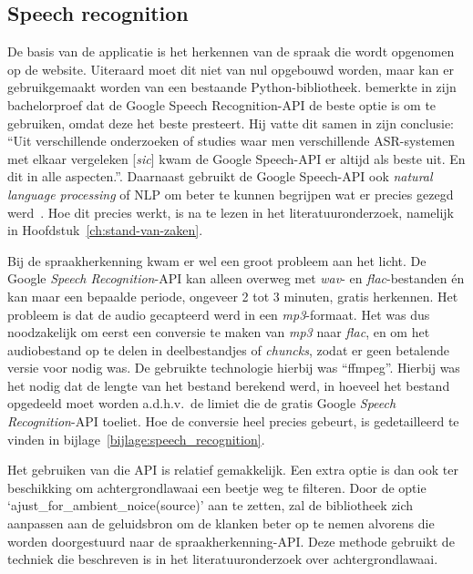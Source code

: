\subsection{Speech recognition}
De basis van de applicatie is het herkennen van de spraak die wordt opgenomen op de website. Uiteraard moet dit niet van nul opgebouwd worden, maar kan er gebruikgemaakt worden van een bestaande Python-bibliotheek. \textcite{Standaert2021} bemerkte in zijn bachelorproef dat  de Google Speech Recognition-API de beste optie is om te gebruiken, omdat deze het beste presteert. Hij vatte dit samen in zijn conclusie: ``Uit verschillende onderzoeken of studies waar men verschillende ASR-systemen met elkaar vergeleken [\textit{sic}] kwam de Google Speech-API er altijd als beste uit. En dit in alle aspecten.''. Daarnaast gebruikt de Google Speech-API ook \textit{natural language processing} of NLP om beter te kunnen begrijpen wat er precies gezegd werd~\autocite{GoogleCloud2022}. Hoe dit precies werkt, is na te lezen in het literatuuronderzoek, namelijk in Hoofdstuk~\ref{ch:stand-van-zaken}.

Bij de spraakherkenning kwam er wel een groot probleem aan het licht. De Google \textit{Speech Recognition}-API kan alleen overweg met \textit{wav}- en \textit{flac}-bestanden én kan maar een bepaalde periode, ongeveer 2 tot 3 minuten, gratis herkennen. Het probleem is dat de audio gecapteerd werd in een \textit{mp3}-formaat. Het was dus noodzakelijk om eerst een conversie te maken van \textit{mp3} naar \textit{flac}, en om het audiobestand op te delen in deelbestandjes of \textit{chuncks}, zodat er geen betalende versie voor nodig was. De gebruikte technologie hierbij was ``ffmpeg''. Hierbij was het nodig dat de lengte van het bestand berekend werd, in hoeveel  het bestand opgedeeld moet worden a.d.h.v.\ de limiet die de gratis Google \textit{Speech Recognition}-API toeliet. Hoe de conversie heel precies gebeurt, is gedetailleerd te vinden in bijlage~\ref{bijlage:speech_recognition}.

Het gebruiken van die API is relatief gemakkelijk. Een extra optie is dan ook ter beschikking om achtergrondlawaai een beetje weg te filteren. Door de optie \newline`ajust\_for\_ambient\_noice(source)' aan te zetten, zal de bibliotheek zich aanpassen aan de geluidsbron om de klanken beter op te nemen alvorens die worden doorgestuurd naar de spraakherkenning-API. Deze methode gebruikt de techniek die beschreven is in het literatuuronderzoek over achtergrondlawaai.

